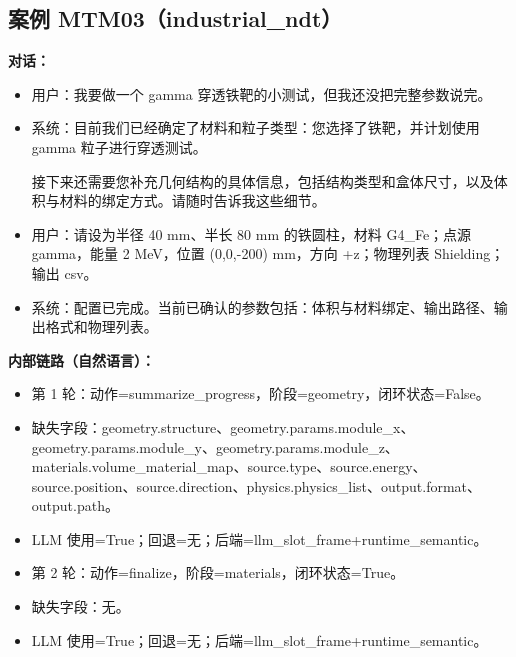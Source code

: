 \documentclass[11pt]{ctexart}
\begin{document}
\subsection{案例 MTM03（industrial\_ndt）}
\textbf{对话：}
\begin{itemize}
\item 用户：我要做一个 gamma 穿透铁靶的小测试，但我还没把完整参数说完。
\item 系统：目前我们已经确定了材料和粒子类型：您选择了铁靶，并计划使用 gamma 粒子进行穿透测试。

接下来还需要您补充几何结构的具体信息，包括结构类型和盒体尺寸，以及体积与材料的绑定方式。请随时告诉我这些细节。
\item 用户：请设为半径 40 mm、半长 80 mm 的铁圆柱，材料 G4\_Fe；点源 gamma，能量 2 MeV，位置 (0,0,-200) mm，方向 +z；物理列表 Shielding；输出 csv。
\item 系统：配置已完成。当前已确认的参数包括：体积与材料绑定、输出路径、输出格式和物理列表。
\end{itemize}
\textbf{内部链路（自然语言）：}
\begin{itemize}
\item 第 1 轮：动作=summarize\_progress，阶段=geometry，闭环状态=False。
\item 缺失字段：geometry.structure、geometry.params.module\_x、geometry.params.module\_y、geometry.params.module\_z、materials.volume\_material\_map、source.type、source.energy、source.position、source.direction、physics.physics\_list、output.format、output.path。
\item LLM 使用=True；回退=无；后端=llm\_slot\_frame+runtime\_semantic。
\item 第 2 轮：动作=finalize，阶段=materials，闭环状态=True。
\item 缺失字段：无。
\item LLM 使用=True；回退=无；后端=llm\_slot\_frame+runtime\_semantic。
\end{itemize}
\end{document}
